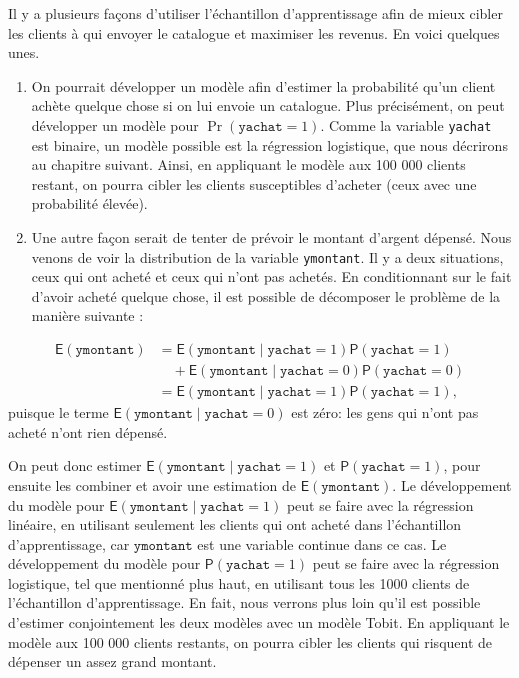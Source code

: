 \documentclass[
  11pt,
  letterpaper,
]{scrbook}
\providecommand{\tightlist}{%
  \setlength{\itemsep}{0pt}\setlength{\parskip}{0pt}}\usepackage{longtable,booktabs,array}
\theoremstyle{definition}
\theoremstyle{remark}
\begin{document}
Il y a plusieurs façons d'utiliser l'échantillon d'apprentissage afin de
mieux cibler les clients à qui envoyer le catalogue et maximiser les
revenus. En voici quelques unes.

\begin{enumerate}
\def\labelenumi{\alph{enumi})}
\tightlist
\item
  On pourrait développer un modèle afin d'estimer la probabilité qu'un
  client achète quelque chose si on lui envoie un catalogue. Plus
  précisément, on peut développer un modèle pour
  \(\Pr(\texttt{yachat}=1)\). Comme la variable \texttt{yachat} est
  binaire, un modèle possible est la régression logistique, que nous
  décrirons au chapitre suivant. Ainsi, en appliquant le modèle aux 100
  000 clients restant, on pourra cibler les clients susceptibles
  d'acheter (ceux avec une probabilité élevée).
\item
  Une autre façon serait de tenter de prévoir le montant d'argent
  dépensé. Nous venons de voir la distribution de la variable
  \texttt{ymontant}. Il y a deux situations, ceux qui ont acheté et ceux
  qui n'ont pas achetés. En conditionnant sur le fait d'avoir acheté
  quelque chose, il est possible de décomposer le problème de la manière
  suivante :
\end{enumerate}

\begin{align*}
\mathsf{E}(\texttt{ymontant}) &= \mathsf{E}(\texttt{ymontant} \mid \texttt{yachat}=1) \mathsf{P}(\texttt{yachat}=1) \\& \quad + 
\mathsf{E}(\texttt{ymontant} \mid \texttt{yachat}=0) \mathsf{P}(\texttt{yachat}=0) \\
 &= \mathsf{E}(\texttt{ymontant} \mid \texttt{yachat}=1) \mathsf{P}(\texttt{yachat}=1),
\end{align*} puisque le terme
\(\mathsf{E}(\texttt{ymontant} \mid \texttt{yachat}=0)\) est zéro: les
gens qui n'ont pas acheté n'ont rien dépensé.

On peut donc estimer
\(\mathsf{E}(\texttt{ymontant} \mid \texttt{yachat}=1)\) et
\(\mathsf{P}(\texttt{yachat}=1)\), pour ensuite les combiner et avoir
une estimation de \(\mathsf{E}(\texttt{ymontant})\). Le développement du
modèle pour \(\mathsf{E}(\texttt{ymontant} \mid \texttt{yachat}=1)\)
peut se faire avec la régression linéaire, en utilisant seulement les
clients qui ont acheté dans l'échantillon d'apprentissage, car
\(\texttt{ymontant}\) est une variable continue dans ce cas. Le
développement du modèle pour \(\mathsf{P}(\texttt{yachat}=1)\) peut se
faire avec la régression logistique, tel que mentionné plus haut, en
utilisant tous les 1000 clients de l'échantillon d'apprentissage. En
fait, nous verrons plus loin qu'il est possible d'estimer conjointement
les deux modèles avec un modèle Tobit. En appliquant le modèle aux 100
000 clients restants, on pourra cibler les clients qui risquent de
dépenser un assez grand montant.
\end{document}
